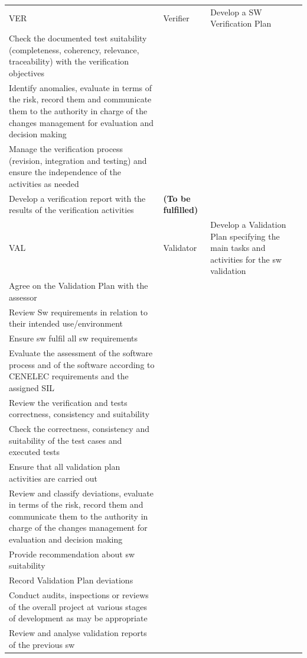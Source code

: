 \documentclass{template/openetcs_article}
\begin{document}
\begin{landscape}
\begin{flushleft}
\begin{supertabular}[H]{|m{1cm}|m{2,5cm}|m{15cm}|m{6cm}|}
\\\hline
VER &
Verifier &
\raggedright
Develop a SW Verification Plan \\
Check the documented test suitability (completeness, coherency, relevance, traceability) with the verification objectives\\
Identify anomalies, evaluate in terms of the risk, record them and communicate them to the authority in charge of the changes management for evaluation and decision making\\
Manage the verification process (revision, integration and testing) and ensure the independence of the activities as needed\\
Develop a verification report with the results of the verification activities &
\textbf{(To be fulfilled)}
\\\hline
VAL &
Validator &
\raggedright
Develop a Validation Plan specifying the main tasks and activities for the sw validation\\
Agree on the Validation Plan with the assessor\\
Review Sw requirements in relation to their intended use/environment\\
Ensure sw fulfil all sw requirements\\
Evaluate the assessment of the software process and of the software according to CENELEC requirements and the assigned SIL\\
Review the verification and tests correctness, consistency and suitability \\
Check the correctness, consistency and suitability of the test cases and executed tests\\
Ensure that all validation plan activities are carried out\\
Review and classify deviations, evaluate in terms of the risk, record them and communicate them to the authority in charge of the changes management for evaluation and decision making\\ 
Provide recommendation about sw suitability\\
Record Validation Plan deviations\\
Conduct audits, inspections or reviews of the overall project at various stages of development as may be appropriate\\
Review and analyse validation reports of the previous sw\\

\end{supertabular}
\end{flushleft}
\end{landscape}
\end{document}
